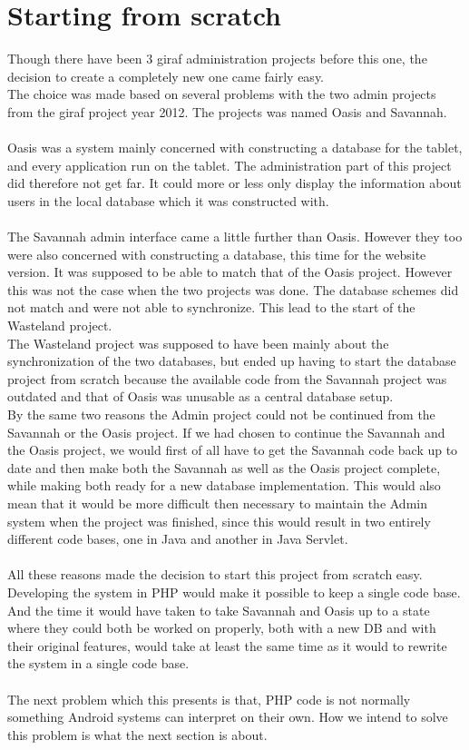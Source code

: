 \section{Starting from scratch}
Though there have been 3 \ac{giraf} administration projects before this one, the decision to create a completely new one came fairly easy.\\
The choice was made based on several problems with the two admin projects from the \ac{giraf} project year 2012. The projects was named Oasis and Savannah.\\
\\
Oasis was a system mainly concerned with constructing a database for the tablet, and every application run on the tablet. The administration part of this project did therefore not get far. It could more or less only display the information about users in the local database which it was constructed with.\\
\\
The Savannah admin interface came a little further than Oasis. However they too were also concerned with constructing a database, this time for the website version. It was supposed to be able to match that of the Oasis project. However this was not the case when the two projects was done. The database schemes did not match and were not able to synchronize. This lead to the start of the Wasteland project.\\
The Wasteland project was supposed to have been mainly about the synchronization of the two databases, but ended up having to start the database project from scratch because the available code from the Savannah project was outdated and that of Oasis was unusable as a central database setup.\\
By the same two reasons the Admin project could not be continued from the Savannah or the Oasis project. If we had chosen to continue the Savannah and the Oasis project, we would first of all have to get the Savannah code back up to date and then make both the Savannah as well as the Oasis project complete, while making both ready for a new database implementation. This would also mean that it would be more difficult then necessary to maintain the Admin system when the project was finished, since this would result in two entirely different code bases, one in Java and another in Java Servlet.\\
\\
All these reasons made the decision to start this project from scratch easy. Developing the system in PHP would make it possible to keep a single code base. And the time it would have taken to take Savannah and Oasis up to a state where they could both be worked on properly, both with a new DB and with their original features, would take at least the same time as it would to rewrite the system in a single code base.\\
\\
The next problem which this presents is that, PHP code is not normally something Android systems can interpret on their own. How we intend to solve this problem is what the next section is about.

